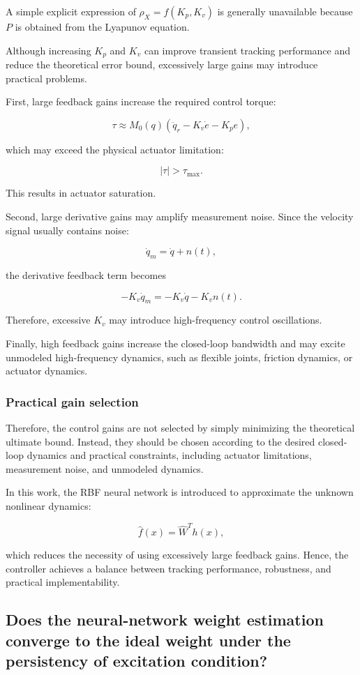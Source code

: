 A simple explicit expression of $\rho_X=f(K_p,K_v)$ is generally unavailable because $P$ is obtained from the Lyapunov equation.


Although increasing $K_p$ and $K_v$ can improve transient tracking performance and reduce the theoretical error bound, excessively large gains may introduce practical problems.


First, large feedback gains increase the required control torque:

\[
\tau
\approx
M_0(q)
(
\ddot q_r-K_v\dot e-K_pe
),
\]

which may exceed the physical actuator limitation:

\[
|\tau|>\tau_{\max}.
\]

This results in actuator saturation.


Second, large derivative gains may amplify measurement noise. Since the velocity signal usually contains noise:

\[
\dot q_m=\dot q+n(t),
\]

the derivative feedback term becomes

\[
-K_v\dot q_m
=
-K_v\dot q-K_v n(t).
\]

Therefore, excessive $K_v$ may introduce high-frequency control oscillations.


Finally, high feedback gains increase the closed-loop bandwidth and may excite unmodeled high-frequency dynamics, such as flexible joints, friction dynamics, or actuator dynamics.


\subsubsection{Practical gain selection}

Therefore, the control gains are not selected by simply minimizing the theoretical ultimate bound. Instead, they should be chosen according to the desired closed-loop dynamics and practical constraints, including actuator limitations, measurement noise, and unmodeled dynamics.

In this work, the RBF neural network is introduced to approximate the unknown nonlinear dynamics:

\[
\hat f(x)=\hat W^Th(x),
\]

which reduces the necessity of using excessively large feedback gains. Hence, the controller achieves a balance between tracking performance, robustness, and practical implementability.

\subsection{Does the neural-network weight estimation converge to the ideal weight under the persistency of excitation condition?}

